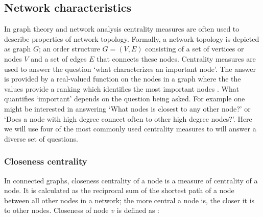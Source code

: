 \documentclass[twoside, twocolumn]{article}
\begin{document}
%



%
%

	\subsection{Network characteristics}
	In graph theory and network analysis centrality measures are often used to describe properties of network topology. Formally, a network topology is depicted as graph $G$; an order structure $G = (V, E)$ consisting of a set of vertices or nodes $V$ and a set of edges $E$ that connects these nodes. Centrality measures are used to answer the question `what characterizes an important node'. The answer is provided by a real-valued function on the nodes in a graph where the the values provide a ranking which identifies the most important nodes \cite{Borgatti2005, Borgatti2006}.
	What quantifies `important' depends on the question being asked. For example one might be interested in answering `What nodes is closest to any other node?' or `Does a node with high degree connect often to other high degree nodes?'. Here we will use four of the most commonly used centrality measures to will answer a diverse set of questions.

	\subsubsection*{Closeness centrality}
	In connected graphs, closeness centrality of a node is a measure of centrality of a node. It is calculated as the reciprocal sum of the shortest path of a node between all other nodes in a network; the more central a node is, the closer it is to other nodes. Closeness of node $v$ is defined as \cite{Bavalas1950}:
%
\end{document}
